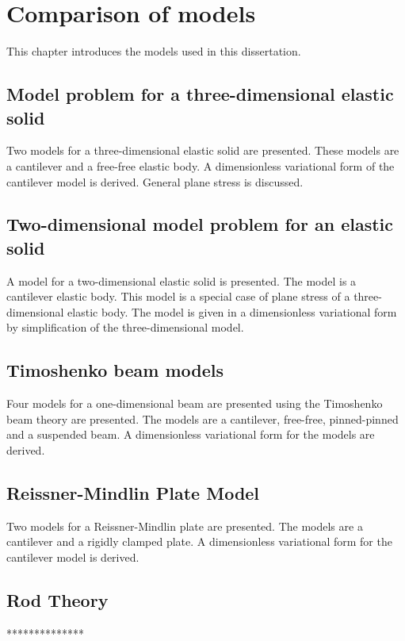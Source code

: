 \documentclass[../main.tex]{subfiles}
\begin{document}


\section{Comparison of models}
This chapter introduces the models used in this dissertation.

\subsection{Model problem for a three-dimensional elastic solid}

Two models for a three-dimensional elastic solid are presented. These models are a cantilever and a free-free elastic body. A dimensionless variational form of the cantilever model is derived. General plane stress is discussed.

\subsection{Two-dimensional model problem for an elastic solid}

A model for a two-dimensional elastic solid is presented. The model is a cantilever elastic body. This model is a special case of plane stress of a three-dimensional elastic body. The model is given in a dimensionless variational form by simplification of the three-dimensional model.

\subsection{Timoshenko beam models}

Four models for a one-dimensional beam are presented using the Timoshenko beam theory are presented. The models are a cantilever, free-free, pinned-pinned and a suspended beam. A dimensionless variational form for the models are derived.

\subsection{Reissner-Mindlin Plate Model}

Two models for a Reissner-Mindlin plate are presented. The models are a cantilever and a rigidly clamped plate. A dimensionless variational form for the cantilever model is derived.

\subsection{Rod Theory}
**************
\end{document}
